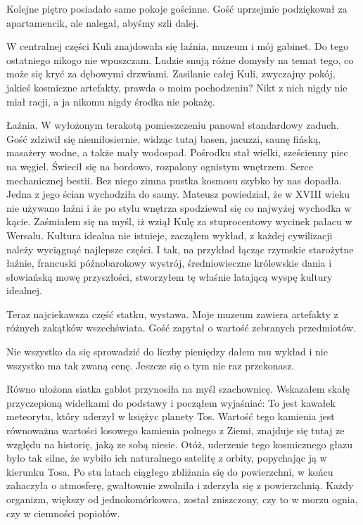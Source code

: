 Kolejne piętro posiadało same pokoje gościnne. 
Gość uprzejmie podziękował za apartamencik, ale nalegał, abyśmy szli dalej.

W centralnej części Kuli znajdowała się łaźnia, muzeum i mój gabinet. Do tego ostatniego nikogo nie wpuszczam.
Ludzie snują różne domysły na temat tego, co może się kryć za dębowymi drzwiami. 
Zasilanie całej Kuli, zwyczajny pokój, jakieś kosmiczne artefakty, prawda o moim pochodzeniu?
Nikt z nich nigdy nie miał racji, a ja nikomu nigdy środka nie pokażę.

Łaźnia. W wyłożonym terakotą pomieszczeniu panował standardowy zaduch. 
Gość zdziwił się niemiłosiernie, widząc tutaj basen, jacuzzi, saunę fińską, masażery wodne, a także mały wodospad.
Pośrodku stał wielki, sześcienny piec na węgiel. Świecił się na bordowo, rozpalony ognistym wnętrzem. Serce mechanicznej bestii.
Bez niego zimna pustka kosmosu szybko by nas dopadła.
Jedna z jego ścian wychodziła do sauny.
Mateusz powiedział, że w XVIII wieku nie używano łaźni i że po stylu wnętrza spodziewał się co najwyżej wychodka w kącie. 
Zaśmiałem się na myśl, iż wziął Kulę za stuprocentowy wycinek pałacu w Wersalu.
Kultura idealna nie istnieje, zacząłem wykład, z każdej cywilizacji należy wyciągnąć najlepsze części. 
I tak, na przykład łącząc rzymskie starożytne łaźnie, francuski późnobarokowy wystrój, średniowieczne królewskie dania i słowiańską mowę przyszłości, 
stworzyłem tę właśnie latającą wyspę kultury idealnej.

Teraz najciekawsza część statku, wystawa.
Moje muzeum zawiera artefakty z różnych zakątków wszechświata. Gość zapytał o wartość zebranych przedmiotów.
\begin{dialogue}
\ds{} Nie wszystko da się sprowadzić do liczby pieniędzy \dm{} dałem mu wykład \dm{} i nie wszystko ma tak zwaną cenę. 
Jeszcze się o tym nie raz przekonasz.
\end{dialogue}

Równo ułożona siatka gablot przynosiła na myśl szachownicę.
Wskazałem skałę przyczepioną widełkami do podstawy i począłem wyjaśniać:
To jest kawałek meteorytu, który uderzył w księżyc planety Tos. Wartość tego kamienia jest równoważna wartości losowego kamienia polnego z Ziemi, 
znajduje się tutaj ze względu na historię, jaką ze sobą niesie.
Otóż, uderzenie tego kosmicznego głazu było tak silne, że wybiło ich naturalnego satelitę z orbity, popychając ją w kierunku Tosa.
Po stu latach ciągłego zbliżania się do powierzchni, w końcu zahaczyła o atmosferę, gwałtownie zwolniła i zderzyła się z powierzchnią.
Każdy organizm, większy od jednokomórkowca, został zniszczony, czy to w morzu ognia, czy w ciemności popiołów.

